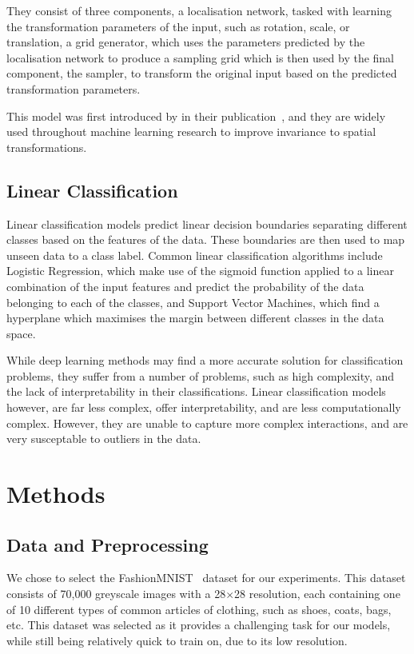 \documentclass[twocolumn]{article}
\begin{document}
They consist of three components, a localisation network, tasked with learning the transformation parameters of the input, such as rotation, scale, or translation, a grid generator, which uses the parameters predicted by the localisation network to produce a sampling grid which is then used by the final component, the sampler, to transform the original input based on the predicted transformation parameters. 

This model was first introduced by \citeauthor{jaderberg2016spatialtransformernetworks} in their \citeyear{jaderberg2016spatialtransformernetworks} publication~\cite{jaderberg2016spatialtransformernetworks}, and they are widely used throughout machine learning research to improve invariance to spatial transformations. 

\subsection{Linear Classification}

Linear classification models predict linear decision boundaries separating different classes based on the features of the data. These boundaries are then used to map unseen data to a class label. Common linear classification algorithms include Logistic Regression, which make use of the sigmoid function applied to a linear combination of the input features and predict the probability of the data belonging to each of the classes, and Support Vector Machines, which find a hyperplane which maximises the margin between different classes in the data space. 

While deep learning methods may find a more accurate solution for classification problems, they suffer from a number of problems, such as high complexity, and the lack of interpretability in their classifications. Linear classification models however, are far less complex, offer interpretability, and are less computationally complex. However, they are unable to capture more complex interactions, and are very susceptable to outliers in the data.

\section{Methods}

\subsection{Data and Preprocessing}

We chose to select the FashionMNIST~\cite{xiao2017fashion} dataset for our experiments. This dataset consists of 70,000 greyscale images with a 28\(\times\)28 resolution, each containing one of 10 different types of common articles of clothing, such as shoes, coats, bags, etc. This dataset was selected as it provides a challenging task for our models, while still being relatively quick to train on, due to its low resolution. 
\end{document}
